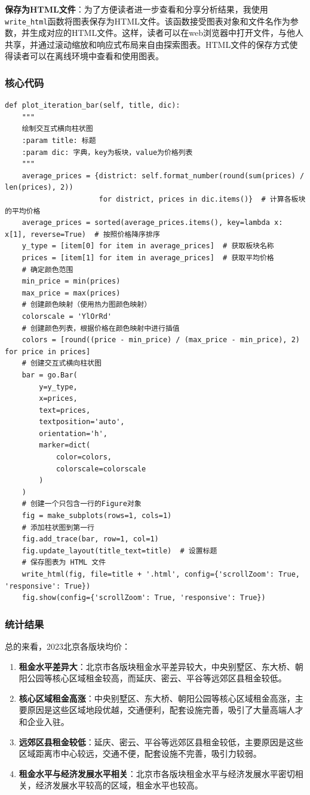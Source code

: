 \documentclass[lang=cn,11pt,a4paper]{elegantpaper}
\begin{document}
\textbf{保存为HTML文件}：为了方便读者进一步查看和分享分析结果，我使用\lstinline{write_html}函数将图表保存为HTML文件。该函数接受图表对象和文件名作为参数，并生成对应的HTML文件。这样，读者可以在web浏览器中打开文件，与他人共享，并通过滚动缩放和响应式布局来自由探索图表。HTML文件的保存方式使得读者可以在离线环境中查看和使用图表。

\subsubsection{核心代码}
\begin{lstlisting}
def plot_iteration_bar(self, title, dic):
    """
    绘制交互式横向柱状图
    :param title: 标题
    :param dic: 字典，key为板块，value为价格列表
    """
    average_prices = {district: self.format_number(round(sum(prices) / len(prices), 2))
                      for district, prices in dic.items()}  # 计算各板块的平均价格
    average_prices = sorted(average_prices.items(), key=lambda x: x[1], reverse=True)  # 按照价格降序排序
    y_type = [item[0] for item in average_prices]  # 获取板块名称
    prices = [item[1] for item in average_prices]  # 获取平均价格
    # 确定颜色范围
    min_price = min(prices)
    max_price = max(prices)
    # 创建颜色映射（使用热力图颜色映射）
    colorscale = 'YlOrRd'
    # 创建颜色列表，根据价格在颜色映射中进行插值
    colors = [round((price - min_price) / (max_price - min_price), 2) for price in prices]
    # 创建交互式横向柱状图
    bar = go.Bar(
        y=y_type,
        x=prices,
        text=prices,
        textposition='auto',
        orientation='h',
        marker=dict(
            color=colors,
            colorscale=colorscale
        )
    )
    # 创建一个只包含一行的Figure对象
    fig = make_subplots(rows=1, cols=1)
    # 添加柱状图到第一行
    fig.add_trace(bar, row=1, col=1)
    fig.update_layout(title_text=title)  # 设置标题
    # 保存图表为 HTML 文件
    write_html(fig, file=title + '.html', config={'scrollZoom': True, 'responsive': True})
    fig.show(config={'scrollZoom': True, 'responsive': True})
\end{lstlisting}

\subsubsection{统计结果}

总的来看，2023北京各版块均价：

\begin{enumerate}
    \item \textbf{租金水平差异大}：北京市各版块租金水平差异较大，中央别墅区、东大桥、朝阳公园等核心区域租金较高，而延庆、密云、平谷等远郊区县租金较低。
    \item \textbf{核心区域租金高涨}：中央别墅区、东大桥、朝阳公园等核心区域租金高涨，主要原因是这些区域地段优越，交通便利，配套设施完善，吸引了大量高端人才和企业入驻。
    \item \textbf{远郊区县租金较低}：延庆、密云、平谷等远郊区县租金较低，主要原因是这些区域距离市中心较远，交通不便，配套设施不完善，吸引力较弱。
    \item \textbf{租金水平与经济发展水平相关}：北京市各版块租金水平与经济发展水平密切相关，经济发展水平较高的区域，租金水平也较高。
\end{enumerate}
\end{document}
